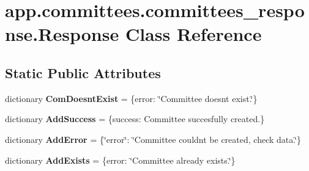\hypertarget{classapp_1_1committees_1_1committees__response_1_1_response}{}\section{app.\+committees.\+committees\+\_\+response.\+Response Class Reference}
\label{classapp_1_1committees_1_1committees__response_1_1_response}
\subsection*{Static Public Attributes}
\begin{DoxyCompactItemize}
\item 
\mbox{\label{classapp_1_1committees_1_1committees__response_1_1_response_a7523e8642525b1922673b307735014ef}} 
dictionary {\bfseries Com\+Doesnt\+Exist} = \{\textquotesingle{}error\textquotesingle{}\+: \char`\"{}Committee doesn\textquotesingle{}t exist.\char`\"{}\}
\item 
\mbox{\label{classapp_1_1committees_1_1committees__response_1_1_response_adea4eaeb74bffca46018d5f174b3720c}} 
dictionary {\bfseries Add\+Success} = \{\textquotesingle{}success\textquotesingle{}\+: \textquotesingle{}Committee succesfully created.\textquotesingle{}\}
\item 
\mbox{\label{classapp_1_1committees_1_1committees__response_1_1_response_a0dac6a6c6e08fe5664ee8c0c5ef49f02}} 
dictionary {\bfseries Add\+Error} = \{\char`\"{}error\char`\"{}\+: \char`\"{}Committee couldn\textquotesingle{}t be created, check data.\char`\"{}\}
\item 
\mbox{\label{classapp_1_1committees_1_1committees__response_1_1_response_a4e762bac4b56cfbd6529e3580b8ef107}} 
dictionary {\bfseries Add\+Exists} = \{\textquotesingle{}error\textquotesingle{}\+: \char`\"{}Committee already exists.\char`\"{}\}
\item 
\mbox{\label{classapp_1_1committees_1_1committees__response_1_1_response_afb7619a62ca421483e958cd2f8a790e9}} 

\end{DoxyCompactItemize}
